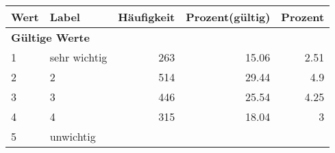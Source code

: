      \begin{longtable}{lXrrr}
     \toprule
     \textbf{Wert} & \textbf{Label} & \textbf{Häufigkeit} & \textbf{Prozent(gültig)} & \textbf{Prozent} \\
     \endhead
     \midrule
     \multicolumn{5}{l}{\textbf{Gültige Werte}}\\

     1 &
     \multicolumn{1}{X}{ sehr wichtig   } &


       \num{263} &
       \num[round-mode=places,round-precision=2]{15.06} &
         \num[round-mode=places,round-precision=2]{2.51} \\

     2 &
     \multicolumn{1}{X}{ 2   } &


       \num{514} &
       \num[round-mode=places,round-precision=2]{29.44} &
         \num[round-mode=places,round-precision=2]{4.9} \\

     3 &
     \multicolumn{1}{X}{ 3   } &


       \num{446} &
       \num[round-mode=places,round-precision=2]{25.54} &
         \num[round-mode=places,round-precision=2]{4.25} \\

     4 &
     \multicolumn{1}{X}{ 4   } &


       \num{315} &
       \num[round-mode=places,round-precision=2]{18.04} &
         \num[round-mode=places,round-precision=2]{3} \\

     5 &
     \multicolumn{1}{X}{ unwichtig   } &



\end{longtable}
